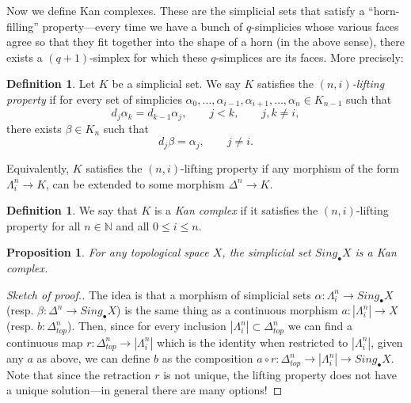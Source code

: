 \documentclass[a4paper]{amsart}
\numberwithin{figure}{section}
\theoremstyle{theorem}
\newtheorem{prop}[thm]{Proposition}
\theoremstyle{definition}
\newtheorem{defi}[thm]{Definition}
\newcommand{\NN}{\mathbb{N}}
\begin{document}
Now we define Kan complexes. These are the simplicial sets that satisfy a ``horn-filling'' property---every time we have a bunch of $q$-simplicies whose various faces agree so that they fit together into the shape of a horn (in the above sense), there exists a $(q+1)$-simplex for which these $q$-simplices are its faces. More precisely: \\

\begin{mdframed}
\begin{defi} \label{defi:KanCond}
Let $K$ be a simplicial set. We say $K$ satisfies the \emph{$(n, i)$-lifting property} if for every set of simplicies $\alpha_0, \dots, \alpha_{i-1}, \alpha_{i+1}, \dots, \alpha_{n} \in K_{n-1}$ such that 
\begin{equation} \label{equa:KanHypo}
d_j\alpha_k = d_{k-1}\alpha_j, \qquad j < k, \qquad j, k \neq i, 
\end{equation}
there exists $\beta \in K_{n}$ such that 
\begin{equation} \label{equa:Kanconclu}
d_j\beta = \alpha_j, \qquad j \neq i.
\end{equation} 

Equivalently, $K$ satisfies the $(n, i)$-lifting property if any morphism of the form $\Lambda^{n}_i {\to} K$, can be extended to some morphism $\Delta^{n} {\to} K$.
\end{defi}
\end{mdframed}

\vspace{\baselineskip}

\begin{mdframed}
\begin{defi} \label{defi:KanComp}
We say that $K$ is a \emph{Kan complex} if it satisfies the $(n, i)$-lifting property for all $n \in \NN$ and all $0 \leq i \leq n$. 
\end{defi}
\end{mdframed}

\vspace{\baselineskip}

\begin{mdframed}
\begin{prop}
For any topological space $X$, the simplicial set $Sing_\bullet X$ is a Kan complex.
\end{prop}
\end{mdframed}

\begin{proof}[Sketch of proof.]
The idea is that a morphism of simplicial sets $\alpha: \Lambda^n_i \to Sing_\bullet X$ (resp. $\beta: \Delta^n \to Sing_\bullet X$) is the same thing as a continuous morphism $a: |\Lambda^n_i| \to X$ (resp. $b: \Delta^n_{top}$). Then, since for every inclusion $|\Lambda^n_i| \subset \Delta^n_{top}$ we can find a continuous map $r: \Delta^n_{top} \to |\Lambda^n_i|$ which is the identity when restricted to $|\Lambda^n_i|$, given any $a$ as above, we can define $b$ as the composition $a \circ r: \Delta^n_{top} \to |\Lambda^n_i| \to Sing_\bullet X$.  Note that since the retraction $r$ is not unique, the lifting property does not have a unique solution---in general there are many options!
\end{proof}
\end{document}
